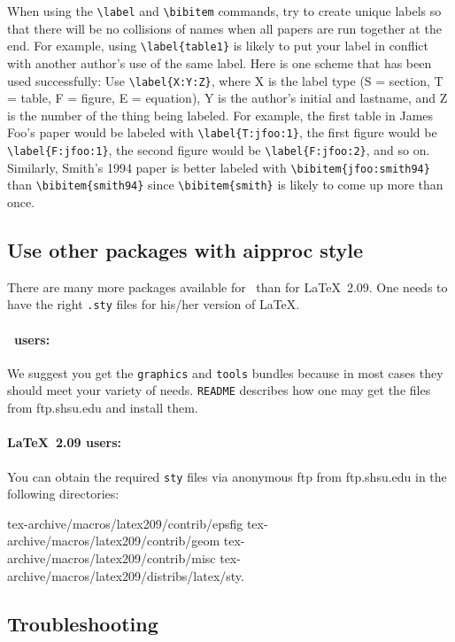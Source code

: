 When using the \verb+\label+ and \verb+\bibitem+ commands, try to create 
unique labels so that there will be no collisions of names when all papers
are run together at the end. For example, using \verb+\label{table1}+ is
likely to put your label in conflict with another author's use of the
same label. Here is one scheme that has been used successfully:
Use \verb+\label{X:Y:Z}+, where X is the label type (S = section, T = table,
F = figure, E = equation), Y is the author's initial and lastname, and Z 
is the number
of the thing being labeled. For example, the first table in James Foo's paper
would be labeled with \verb+\label{T:jfoo:1}+, the first figure would be
\verb+\label{F:jfoo:1}+, the second figure would be \verb+\label{F:jfoo:2}+, 
and so on.
Similarly, Smith's 1994 paper is better labeled with
\verb+\bibitem{jfoo:smith94}+ than \verb+\bibitem{smith94}+ since 
\verb+\bibitem{smith}+ is likely to come up more than once.


\subsection{Use other packages with aipproc style}
There are many more packages available for \latexe\ than for \LaTeX\ 2.09. 
One needs to have the right \verb+.sty+ files for his/her version of \LaTeX.

\paragraph{\latexe\ users:} We suggest you get the \verb+graphics+ and 
\verb+tools+ bundles because in most cases they should meet your variety of 
needs. \verb+README+ describes how one may get the files from
ftp.shsu.edu and install them.

\paragraph{\LaTeX\ 2.09 users:} You can obtain the required \verb+sty+ files 
          via anonymous ftp from ftp.shsu.edu in the following directories:

\noindent  tex-archive/macros/latex209/contrib/epsfig
           tex-archive/macros/latex209/contrib/geom
           tex-archive/macros/latex209/contrib/misc
           tex-archive/macros/latex209/distribs/latex/sty.
 
\subsection{Troubleshooting}
\label{hints}
 
